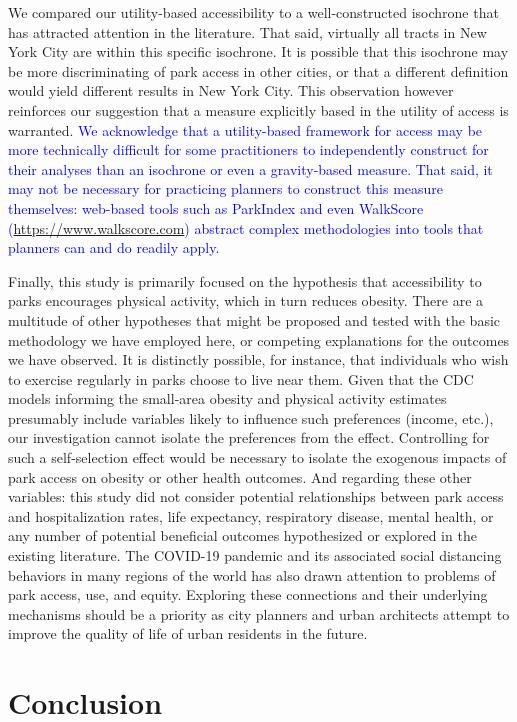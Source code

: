 \documentclass[shortAfour,sageh.bst]{sagej}
\begin{document}
We compared our utility-based accessibility to a well-constructed
isochrone that has attracted attention in the literature. That said,
virtually all tracts in New York City are within this specific
isochrone. It is possible that this isochrone may be more discriminating
of park access in other cities, or that a different definition would
yield different results in New York City. This observation however
reinforces our suggestion that a measure explicitly based in the utility
of access is warranted. \textcolor{blue}{We acknowledge that a utility-based framework
for access may be more technically difficult for some practitioners to
independently construct for their analyses than an isochrone or even a
gravity-based measure. That said, it may not be necessary for practicing
planners to construct this measure themselves: web-based tools such as
ParkIndex \citep{Kaczynski2016} and even WalkScore
(\url{https://www.walkscore.com}) abstract complex methodologies into
tools that planners can and do readily apply.}

Finally, this study is primarily focused on the hypothesis that
accessibility to parks encourages physical activity, which in turn
reduces obesity. There are a multitude of other hypotheses that might be
proposed and tested with the basic methodology we have employed here, or
competing explanations for the outcomes we have observed. It is
distinctly possible, for instance, that individuals who wish to exercise
regularly in parks choose to live near them. Given that the CDC models
informing the small-area obesity and physical activity estimates
presumably include variables likely to influence such preferences
(income, etc.), our investigation cannot isolate the preferences from
the effect. Controlling for such a self-selection effect would be
necessary to isolate the exogenous impacts of park access on obesity or
other health outcomes. And regarding these other variables: this study
did not consider potential relationships between park access and
hospitalization rates, life expectancy, respiratory disease, mental
health, or any number of potential beneficial outcomes hypothesized or
explored in the existing literature. The COVID-19 pandemic and its
associated social distancing behaviors in many regions of the world has
also drawn attention to problems of park access, use, and equity.
Exploring these connections and their underlying mechanisms should be a
priority as city planners and urban architects attempt to improve the
quality of life of urban residents in the future.

\hypertarget{conclusion}{%
\section{Conclusion}\label{conclusion}}
\end{document}
